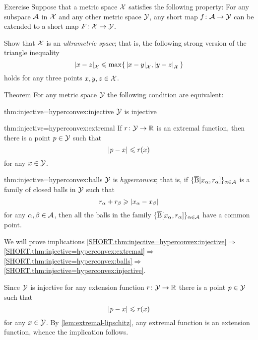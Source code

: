 \begin{thm}{Exercise}\label{ex:ultrametric}
Suppose that a metric space $\mathcal{X}$ satisfies the following property:
For any subspace $\mathcal{A}$ in $\mathcal{X}$ and any other metric space $\mathcal{Y}$, any short map $f\colon\mathcal{A}\to \mathcal{Y}$ can be extended to a short map $F\colon\mathcal{X}\to \mathcal{Y}$.

Show that $\mathcal{X}$ is an \emph{ultrametric space};
that is, the following strong version of the triangle inequality
\[\dist{x}{z}{\spc{X}}
\le
\max\{\,\dist{x}{y}{\spc{X}},\dist{y}{z}{\spc{X}}\,\}\]
holds for any three points $x,y,z\in \mathcal{X}$.
\end{thm}

\begin{thm}{Theorem}\label{thm:injective=hyperconvex}
For any metric space $\mathcal{Y}$ the following condition are equivalent:

\begin{subthm}{thm:injective=hyperconvex:injective}
$\mathcal{Y}$ is injective
\end{subthm}


\begin{subthm}{thm:injective=hyperconvex:extremal}
If $r\colon\mathcal{Y}\to\mathbb{R}$ is an extremal function, then there is a point $p\in \mathcal{Y}$ such that 
\[\dist{p}{x}{}\le r(x)\]
for any $x\in \mathcal{Y}$.
\end{subthm}

\begin{subthm}{thm:injective=hyperconvex:balls}
$\mathcal{Y}$ is \emph{hyperconvex};
that is, if $\{\overline{\mathrm{B}}{}[x_\alpha,r_\alpha]\}_{\alpha\in\mathcal{A}}$ is a family of closed balls in $\mathcal{Y}$ such that 
 \[r_\alpha+r_\beta\ge \dist{x_\alpha}{x_\beta}{}\]
 for any $\alpha,\beta\in \mathcal{A}$,
then all the balls in the family $\{\overline{\mathrm{B}}{}[x_\alpha,r_\alpha]\}_{\alpha\in\mathcal{A}}$ have a common point.
\end{subthm}

\end{thm}

 We will prove implications 
\ref{SHORT.thm:injective=hyperconvex:injective}$\Rightarrow$\ref{SHORT.thm:injective=hyperconvex:extremal}$\Rightarrow$\ref{SHORT.thm:injective=hyperconvex:balls}$\Rightarrow$\ref{SHORT.thm:injective=hyperconvex:injective}.

Since $\mathcal{Y}$ is injective for any extension function $r\colon\mathcal{Y}\to\mathbb{R}$ there is a point $p\in \mathcal{Y}$ such that 
\[\dist{p}{x}{}\le r(x)\]
for any $x\in \mathcal{Y}$.
By \ref{lem:extremal-lipschitz}, any extremal function is an extension function, whence the implication follows.

